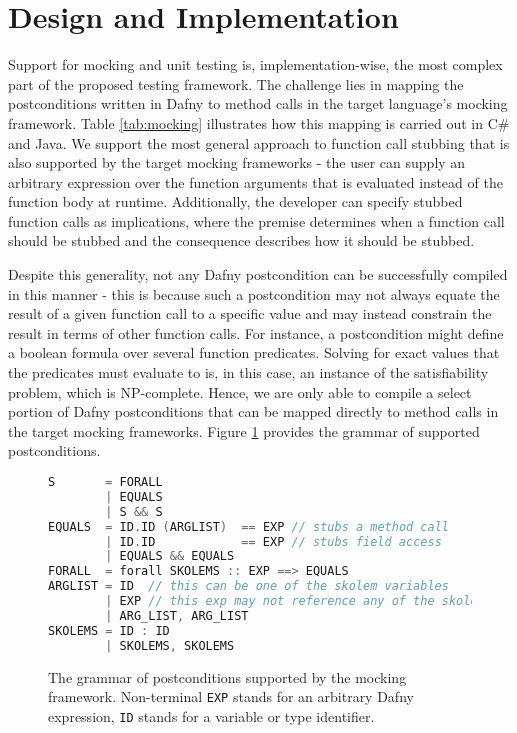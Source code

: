 \documentclass[runningheads]{llncs}
\begin{document}
\section{Design and Implementation}
\label{sec:design}

Support for mocking and unit testing is, implementation-wise, the most complex part of the proposed testing framework. 
The challenge lies in mapping the postconditions written in Dafny to method calls in the target language's mocking framework. Table \ref{tab:mocking} illustrates how this mapping is carried out in C\# and Java. 
We support the most general approach to function call stubbing that is also supported by the target mocking frameworks - the user can supply an arbitrary expression over the function arguments that is evaluated instead of the function body at runtime. 
Additionally, the developer can specify stubbed function calls as implications, where the premise determines when a function call should be stubbed and the consequence describes how it should be stubbed. 

Despite this generality, not any Dafny postcondition can be successfully compiled in this manner - this is because such a postcondition may not always equate the result of a given function call to a specific value and may instead constrain the result in terms of other function calls.
For instance, a postcondition might define a boolean formula over several function predicates. 
Solving for exact values that the predicates must evaluate to is, in this case, an instance of the satisfiability problem, which is NP-complete.
Hence, we are only able to compile a select portion of Dafny postconditions that can be mapped directly to method calls in the target mocking frameworks. 
Figure \ref{grammar} provides the grammar of supported postconditions.


\begin{figure}[h]
\begin{lstlisting}[language=c,basicstyle=\ttfamily\footnotesize]
S       = FORALL 
        | EQUALS 
        | S && S
EQUALS  = ID.ID (ARGLIST)  == EXP // stubs a method call
        | ID.ID            == EXP // stubs field access
        | EQUALS && EQUALS
FORALL  = forall SKOLEMS :: EXP ==> EQUALS
ARGLIST = ID  // this can be one of the skolem variables
        | EXP // this exp may not reference any of the skolems 
        | ARG_LIST, ARG_LIST
SKOLEMS = ID : ID 
        | SKOLEMS, SKOLEMS
\end{lstlisting}
\caption{The grammar of postconditions supported by the mocking framework. Non-terminal \texttt{EXP} stands for an arbitrary Dafny expression, \texttt{ID} stands for a variable or type identifier.}
\label{grammar}
\end{figure}
\end{document}
